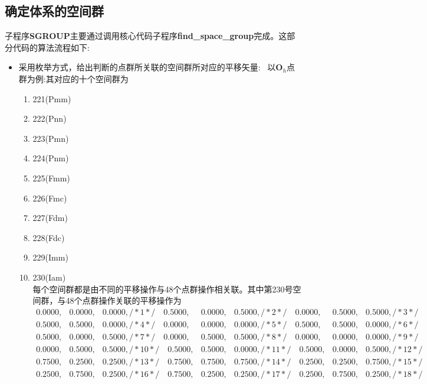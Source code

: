 \subsection{确定体系的空间群}
子程序\textbf{SGROUP}主要通过调用核心代码子程序\textbf{find\_space\_group}完成。这部分代码的算法流程如下:
\begin{itemize}
	\item 采用枚举方式，给出判断的点群所关联的空间群所对应的平移矢量:~
		以$\mathbf{O}_h$点群为例:其对应的十个空间群为
		\begin{enumerate}
			\item 221(P\;m\;-3\;m)
			\item 222(P\;n\;n) 
			\item 223(P\;m\;-3\;n)
			\item 224(P\;n\;m) 
			\item 225(F\;m\;-3\;m)
			\item 226(F\;m\;c)
			\item 227(F\;d\;m) 
			\item 228(F\;d\;c) 
			\item 229(I\;m\;-3\;m)
			\item 230(I\;a\;m)\\
				每个空间群都是由不同的平移操作与48个点群操作相关联。其中第230号空间群，与48个点群操作关联的平移操作为
				\begin{displaymath}
				\begin{matrix}
     0.0000, & 0.0000, & 0.0000, /*    1  */ \quad 0.5000, & 0.0000, & 0.5000, /*    2  */ \quad 0.0000, & 0.5000, & 0.5000, /*    3  */\\
     0.5000, & 0.5000, & 0.0000, /*    4  */ \quad 0.0000, & 0.0000, & 0.0000, /*    5  */ \quad 0.5000, & 0.5000, & 0.0000, /*    6  */ \\
     0.5000, & 0.0000, & 0.5000, /*    7  */ \quad 0.0000, & 0.5000, & 0.5000, /*    8  */ \quad 0.0000, & 0.0000, & 0.0000, /*    9  */ \\
     0.0000, & 0.5000, & 0.5000, /*    10  */\quad 0.5000, & 0.5000, & 0.0000, /*    11  */\quad 0.5000, & 0.0000, & 0.5000, /*    12  */\\
     0.7500, & 0.2500, & 0.2500, /*    13  */\quad 0.7500, & 0.7500, & 0.7500, /*    14  */\quad 0.2500, & 0.2500, & 0.7500, /*    15  */\\
     0.2500, & 0.7500, & 0.2500, /*    16  */\quad 0.7500, & 0.2500, & 0.2500, /*    17  */\quad 0.2500, & 0.7500, & 0.2500, /*    18  */\\

\end{matrix}
\end{displaymath}
\end{enumerate}
\end{itemize}
